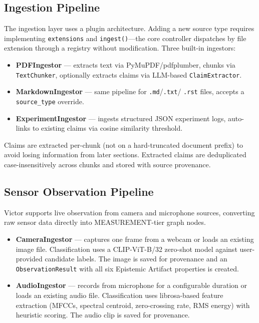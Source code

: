 \documentclass[letterpaper]{article}          %
\theoremstyle{plain}
\theoremstyle{definition}
\theoremstyle{remark}
\begin{document}
\subsection{Ingestion Pipeline}

The ingestion layer uses a plugin architecture. Adding a new source type requires
implementing \texttt{extensions} and \texttt{ingest()}---the core controller
dispatches by file extension through a registry without modification. Three built-in
ingestors:

\begin{itemize}
    \item \textbf{PDFIngestor} --- extracts text via PyMuPDF/pdfplumber, chunks
    via \texttt{TextChunker}, optionally extracts claims via LLM-based
    \texttt{ClaimExtractor}.
    \item \textbf{MarkdownIngestor} --- same pipeline for \texttt{.md}/\texttt{.txt}/
    \texttt{.rst} files, accepts a \texttt{source\_type} override.
    \item \textbf{ExperimentIngestor} --- ingests structured JSON experiment logs,
    auto-links to existing claims via cosine similarity threshold.
\end{itemize}

Claims are extracted per-chunk (not on a hard-truncated document prefix) to avoid
losing information from later sections. Extracted claims are deduplicated
case-insensitively across chunks and stored with source provenance.

\subsection{Sensor Observation Pipeline}

Victor supports live observation from camera and microphone sources, converting
raw sensor data directly into MEASUREMENT-tier graph nodes.

\begin{itemize}
    \item \textbf{CameraIngestor} --- captures one frame from a webcam or loads
    an existing image file. Classification uses a CLIP-ViT-B/32 zero-shot model
    \citep{radford2021clip} against user-provided candidate labels. The image is
    saved for provenance and an \texttt{ObservationResult} with all six Epistemic
    Artifact properties is created.
    \item \textbf{AudioIngestor} --- records from microphone for a configurable
    duration or loads an existing audio file. Classification uses librosa-based
    feature extraction (MFCCs, spectral centroid, zero-crossing rate, RMS energy)
    with heuristic scoring. The audio clip is saved for provenance.
\end{itemize}
\end{document}
